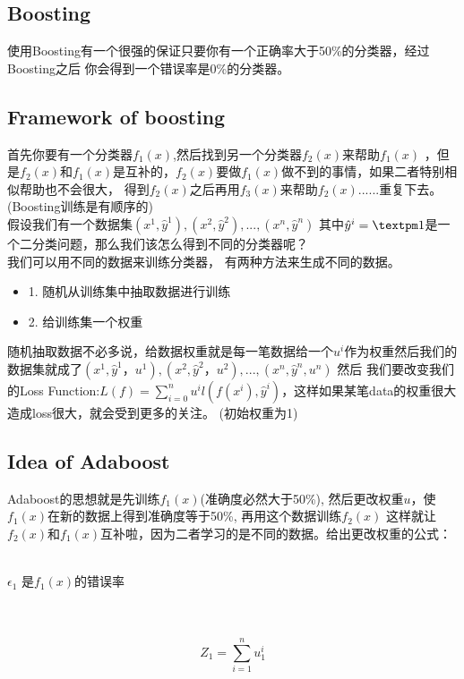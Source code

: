 \subsection{Boosting}
使用Boosting有一个很强的保证只要你有一个正确率大于50\%的分类器，经过Boosting之后
你会得到一个错误率是0\%的分类器。

\subsection{Framework of boosting}
首先你要有一个分类器$f_1(x)$,然后找到另一个分类器$f_2(x)$来帮助$f_1(x)$
，但是$f_2(x)$和$f_1(x)$是互补的，$f_2(x)$要做$f_1(x)$做不到的事情，如果二者特别相似帮助也不会很大，
得到$f_2(x)$之后再用$f_3(x)$来帮助$f_2(x)$......重复下去。
(Boosting训练是有顺序的)
\\
假设我们有一个数据集{{${(x^1, \hat{y}^1), (x^2, \hat{y}^2), ..., (x^n, \hat{y}^n)}$}} 
其中$\hat{y}^i = \textpm 1$是一个二分类问题，那么我们该怎么得到不同的分类器呢？\\
我们可以用不同的数据来训练分类器， 有两种方法来生成不同的数据。

\begin{itemize}
    \item 1. 随机从训练集中抽取数据进行训练
    \item 2. 给训练集一个权重
\end{itemize}


随机抽取数据不必多说，给数据权重就是每一笔数据给一个$u^i$作为权重然后我们的数据集就成了{{${(x^1, \hat{y}^1，u^1), (x^2, \hat{y}^2， u^2), ..., (x^n, \hat{y}^n, u^n)}$}}
然后 我们要改变我们的Loss Function:$L(f) = \sum_{i=0}^{n}u^il(f(x^i), \hat{y}^i)$，这样如果某笔data的权重很大造成loss很大，就会受到更多的关注。
(初始权重为1)
\subsection{Idea of Adaboost}
Adaboost的思想就是先训练$f_1(x)$(准确度必然大于50\%), 然后更改权重$u$，使$f_1(x)$在新的数据上得到准确度等于50\%, 再用这个数据训练$f_2(x)$
这样就让$f_2(x)$和$f_1(x)$互补啦，因为二者学习的是不同的数据。给出更改权重的公式：\\\\
\centerline{${\epsilon}_1$ 是$f_1(x)$的错误率}\\\\

\begin{equation*}
    Z_1 = \sum_{i=1}^n u_1^i
\end{equation*}


